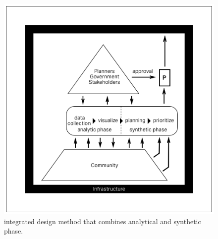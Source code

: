 \begin{figure}[htb]
  \includegraphics[width=\textwidth]{chapters/2/fig/bikebump.png}               
  \caption[diagram: integrated collective design]{integrated design method
  that combines analytical and synthetic phase.}
\label{fig:collective_design}
\end{figure}


